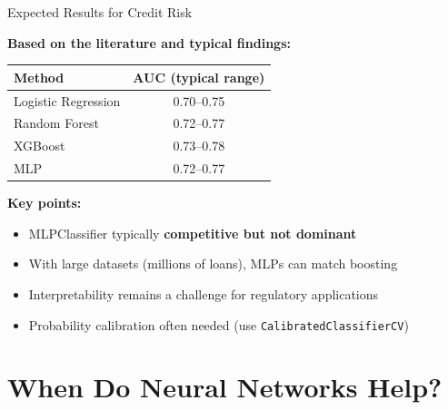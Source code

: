 \documentclass[10pt]{beamer}
\newcommand{\highlight}[1]{\textcolor{AccentOrange}{\textbf{#1}}}
\begin{document}
\begin{frame}{Expected Results for Credit Risk}

  \textbf{Based on the literature and typical findings:}

  \vspace{0.5em}
  \begin{center}
  \begin{tabular}{lc}
    \toprule
    \textbf{Method} & \textbf{AUC (typical range)} \\
    \midrule
    Logistic Regression & 0.70--0.75 \\
    Random Forest & 0.72--0.77 \\
    XGBoost & 0.73--0.78 \\
    MLP & 0.72--0.77 \\
    \bottomrule
  \end{tabular}
  \end{center}

  \vspace{1em}
  \textbf{Key points:}
  \begin{itemize}
    \item MLPClassifier typically \highlight{competitive but not dominant}
    \item With large datasets (millions of loans), MLPs can match boosting
    \item Interpretability remains a challenge for regulatory applications
    \item Probability calibration often needed (use \texttt{CalibratedClassifierCV})
  \end{itemize}
\end{frame}

\section{When Do Neural Networks Help?}
\end{document}
